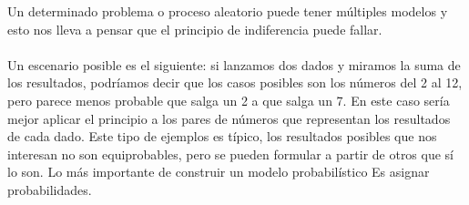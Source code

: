 \documentclass[12pt]{book}
\begin{document}
Un determinado problema o proceso aleatorio puede tener múltiples modelos y esto nos lleva a pensar que el principio de indiferencia puede fallar.
\\
\\

Un escenario posible es el siguiente: si lanzamos dos dados y miramos la suma de los resultados, podríamos decir que los casos posibles son los números del 2 al 12, pero parece menos probable que salga un 2 a que salga un 7. En este caso sería mejor aplicar el principio a los pares de números que representan los resultados de cada dado. Este tipo de ejemplos es típico, los resultados posibles que nos interesan no son equiprobables, pero se pueden formular a partir de otros que sí lo son. Lo más importante de construir un modelo probabilístico Es asignar probabilidades.
\end{document}
